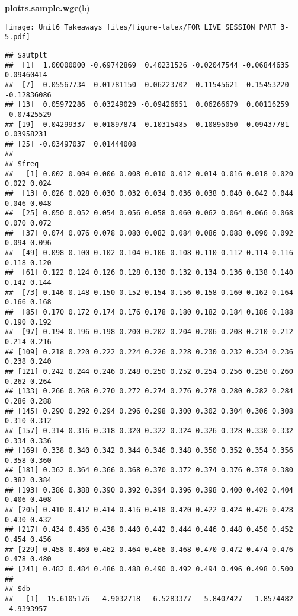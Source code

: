 \documentclass[
]{article}
\newenvironment{Shaded}{\begin{snugshade}}{\end{snugshade}}
\newcommand{\KeywordTok}[1]{\textcolor[rgb]{0.13,0.29,0.53}{\textbf{#1}}}
\newcommand{\NormalTok}[1]{#1}
\begin{document}
\begin{Shaded}
\begin{Highlighting}[]
\KeywordTok{plotts.sample.wge}\NormalTok{(b)}
\end{Highlighting}
\end{Shaded}

\texttt{[image: Unit6\_Takeaways\_files/figure-latex/FOR\_LIVE\_SESSION\_PART\_3-5.pdf]}

\begin{verbatim}
## $autplt
##  [1]  1.00000000 -0.69742869  0.40231526 -0.02047544 -0.06844635  0.09460414
##  [7] -0.05567734  0.01781150  0.06223702 -0.11545621  0.15453220 -0.12836086
## [13]  0.05972286  0.03249029 -0.09426651  0.06266679  0.00116259 -0.07425529
## [19]  0.04299337  0.01897874 -0.10315485  0.10895050 -0.09437781  0.03958231
## [25] -0.03497037  0.01444008
## 
## $freq
##   [1] 0.002 0.004 0.006 0.008 0.010 0.012 0.014 0.016 0.018 0.020 0.022 0.024
##  [13] 0.026 0.028 0.030 0.032 0.034 0.036 0.038 0.040 0.042 0.044 0.046 0.048
##  [25] 0.050 0.052 0.054 0.056 0.058 0.060 0.062 0.064 0.066 0.068 0.070 0.072
##  [37] 0.074 0.076 0.078 0.080 0.082 0.084 0.086 0.088 0.090 0.092 0.094 0.096
##  [49] 0.098 0.100 0.102 0.104 0.106 0.108 0.110 0.112 0.114 0.116 0.118 0.120
##  [61] 0.122 0.124 0.126 0.128 0.130 0.132 0.134 0.136 0.138 0.140 0.142 0.144
##  [73] 0.146 0.148 0.150 0.152 0.154 0.156 0.158 0.160 0.162 0.164 0.166 0.168
##  [85] 0.170 0.172 0.174 0.176 0.178 0.180 0.182 0.184 0.186 0.188 0.190 0.192
##  [97] 0.194 0.196 0.198 0.200 0.202 0.204 0.206 0.208 0.210 0.212 0.214 0.216
## [109] 0.218 0.220 0.222 0.224 0.226 0.228 0.230 0.232 0.234 0.236 0.238 0.240
## [121] 0.242 0.244 0.246 0.248 0.250 0.252 0.254 0.256 0.258 0.260 0.262 0.264
## [133] 0.266 0.268 0.270 0.272 0.274 0.276 0.278 0.280 0.282 0.284 0.286 0.288
## [145] 0.290 0.292 0.294 0.296 0.298 0.300 0.302 0.304 0.306 0.308 0.310 0.312
## [157] 0.314 0.316 0.318 0.320 0.322 0.324 0.326 0.328 0.330 0.332 0.334 0.336
## [169] 0.338 0.340 0.342 0.344 0.346 0.348 0.350 0.352 0.354 0.356 0.358 0.360
## [181] 0.362 0.364 0.366 0.368 0.370 0.372 0.374 0.376 0.378 0.380 0.382 0.384
## [193] 0.386 0.388 0.390 0.392 0.394 0.396 0.398 0.400 0.402 0.404 0.406 0.408
## [205] 0.410 0.412 0.414 0.416 0.418 0.420 0.422 0.424 0.426 0.428 0.430 0.432
## [217] 0.434 0.436 0.438 0.440 0.442 0.444 0.446 0.448 0.450 0.452 0.454 0.456
## [229] 0.458 0.460 0.462 0.464 0.466 0.468 0.470 0.472 0.474 0.476 0.478 0.480
## [241] 0.482 0.484 0.486 0.488 0.490 0.492 0.494 0.496 0.498 0.500
## 
## $db
##   [1] -15.6105176  -4.9032718  -6.5283377  -5.8407427  -1.8574482  -4.9393957

\end{verbatim}
\end{document}
